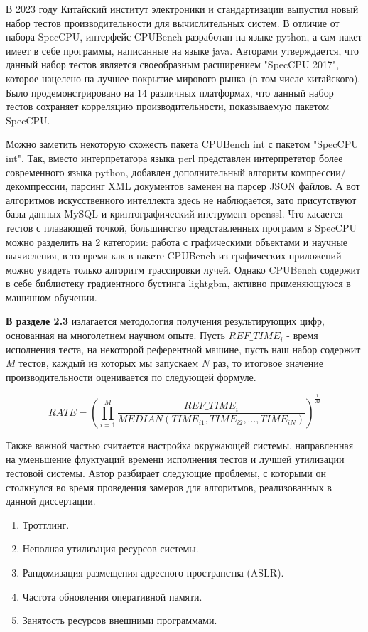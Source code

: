 В 2023 году Китайский институт электроники и стандартизации выпустил
новый набор тестов производительности для вычислительных систем.
В отличие от набора SpecCPU,  интерфейс CPUBench разработан на языке python, а сам пакет имеет в себе программы, написанные на языке java. Авторами утверждается, что данный набор
тестов является своеобразным расширением "SpecCPU 2017", которое нацелено на
лучшее покрытие мирового рынка (в том числе китайского). Было продемонстрировано
на 14 различных платформах, что данный набор тестов сохраняет
корреляцию производительности, показываемую пакетом SpecCPU.

Можно заметить некоторую схожесть пакета CPUBench int с пакетом
"SpecCPU int". Так, вместо интерпретатора языка perl представлен интерпретатор
более современного языка python, добавлен дополнительный алгоритм компрессии/
декомпрессии, парсинг XML документов заменен на парсер JSON файлов.
А вот алгоритмов искусственного интеллекта здесь не наблюдается, зато присутствуют
базы данных MySQL и криптографический инструмент openssl.
Что касается тестов с плавающей точкой, большинство представленных
программ в SpecCPU можно разделить на 2 категории: работа с графическими
объектами и научные вычисления, в то время как в пакете CPUBench из графических
приложений можно увидеть только алгоритм трассировки лучей. Однако
CPUBench содержит в себе библиотеку градиентного бустинга lightgbm, активно
применяющуюся в машинном обучении.



\underline{\textbf{В разделе 2.3}} излагается методология получения результирующих цифр,
основанная на многолетнем научном опыте.
Пусть $REF\_TIME_i$ - время исполнения теста, на некоторой референтной машине, пусть наш набор содержит $M$ тестов, каждый из которых мы запускаем $N$ раз, то итоговое значение производительности оценивается по следующей формуле.

$$RATE =\left(\prod _{i=1}^{M}\dfrac{REF\_TIME_i}{MEDIAN(TIME_{i1}, TIME_{i2}, ... , TIME_{iN})}\right)^{\frac {1}{M}} $$

Также важной частью считается настройка окружающей системы, направленная
на уменьшение флуктуаций времени исполнения тестов и лучшей
утилизации тестовой системы.  Автор разбирает следующие проблемы, с которыми он столкнулся во время проведения замеров для алгоритмов, реализованных в
данной диссертации.
\begin{enumerate}
	\item Троттлинг.
	\item Неполная утилизация ресурсов системы. 
	\item Рандомизация размещения адресного пространства (ASLR).
	\item Частота обновления оперативной памяти.
	\item Занятость ресурсов внешними программами.
\end{enumerate}

